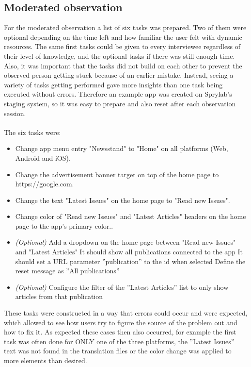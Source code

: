 \subsection{Moderated observation}
\label{subsec:modobs}
For the moderated observation a list of six tasks was prepared. Two of them were optional depending on the time left and how familiar the user felt with dynamic resources.
The same first tasks could be given to every interviewee regardless of their level of knowledge, and the optional tasks if there was still enough time.
Also, it was important that the tasks did not build on each other to prevent the observed person getting stuck because of an earlier mistake.
Instead, seeing a variety of tasks getting performed gave more insights than one task being executed without errors. 
Therefore an example app was created on Sprylab's staging system, so it was easy to prepare and also reset after each observation session.
\\\\
The six tasks were:
\begin{itemize}[itemsep=0mm]
  \item Change app menu entry "Newsstand" to "Home" on all platforms (Web, Android and iOS).
  \item Change the advertisement banner target on top of the home page to https://google.com. 
  \item Change the text "Latest Issues" on the home page to "Read new Issues".
  \item Change color of "Read new Issues" and "Latest Articles" headers on the home page to the app's primary color..
  \item \textit{(Optional)} Add a dropdown on the home page between "Read new Issues" and "Latest Articles"
    \subitem It should show all publications connected to the app
    \subitem It should set a URL parameter ''publication'' to the id when selected
    \subitem Define the reset message as ''All publications''
  \item \textit{(Optional)} Configure the filter of the ''Latest Articles'' list to only show articles from that publication
\end{itemize}

These tasks were constructed in a way that errors could occur and were expected, which allowed to see how users try to figure the source of the problem out and how to fix it.
As expected these cases then also occurred, for example the first task was often done for ONLY one of the three platforms, the ''Latest Issues'' text was not found in the translation files or the color change was applied to more elements than desired.

